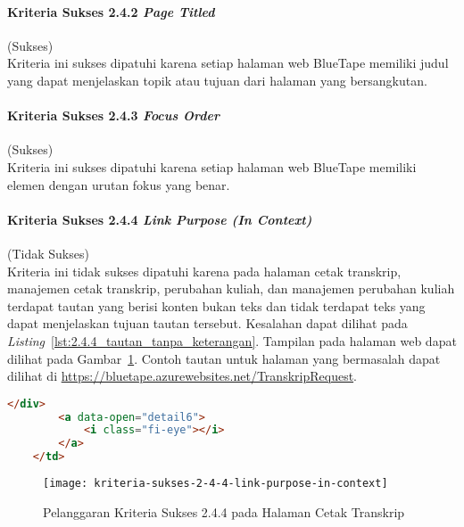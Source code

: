 \paragraph{Kriteria Sukses 2.4.2 \textit{Page Titled}}
\label{par:kepatuhan_bluetape_kriteria_sukses_2.4.2}
(Sukses)\\

Kriteria ini sukses dipatuhi karena setiap halaman web BlueTape memiliki judul yang dapat menjelaskan topik atau tujuan dari halaman yang bersangkutan.

\paragraph{Kriteria Sukses 2.4.3 \textit{Focus Order}}
\label{par:kepatuhan_bluetape_kriteria_sukses_2.4.3}
(Sukses)\\

Kriteria ini sukses dipatuhi karena setiap halaman web BlueTape memiliki elemen dengan urutan fokus yang benar. 

\paragraph{Kriteria Sukses 2.4.4 \textit{Link Purpose (In Context)}}
\label{par:kepatuhan_bluetape_kriteria_sukses_2.4.4}
(Tidak Sukses)\\

Kriteria ini tidak sukses dipatuhi karena pada halaman cetak transkrip, manajemen cetak transkrip, perubahan kuliah, dan manajemen perubahan kuliah terdapat tautan yang berisi konten bukan teks dan tidak terdapat teks yang dapat menjelaskan tujuan tautan tersebut. Kesalahan dapat dilihat pada \mbox{\textit{Listing} \ref{lst:2.4.4_tautan_tanpa_keterangan}}. Tampilan pada halaman web dapat dilihat pada \mbox{Gambar \ref{fig:2.4.4_link_purpose_in_context}}. Contoh tautan untuk halaman yang bermasalah dapat dilihat di \url{https://bluetape.azurewebsites.net/TranskripRequest}.

\begin{lstlisting}[frame=single, label={lst:2.4.4_tautan_tanpa_keterangan}, language=HTML, caption=Pelanggaran Kriteria Sukses 2.4.4 pada Halaman Cetak Transkrip]
        </div>
        <a data-open="detail6">
            <i class="fi-eye"></i>
        </a>
    </td>
\end{lstlisting}

\begin{figure}[H]
    \centering  
    \texttt{[image: kriteria-sukses-2-4-4-link-purpose-in-context]}  
    \caption[Pelanggaran Kriteria Sukses 2.4.4 pada Halaman Cetak Transkrip]{Pelanggaran Kriteria Sukses 2.4.4 pada Halaman Cetak Transkrip}
    \label{fig:2.4.4_link_purpose_in_context}  
\end{figure} 

